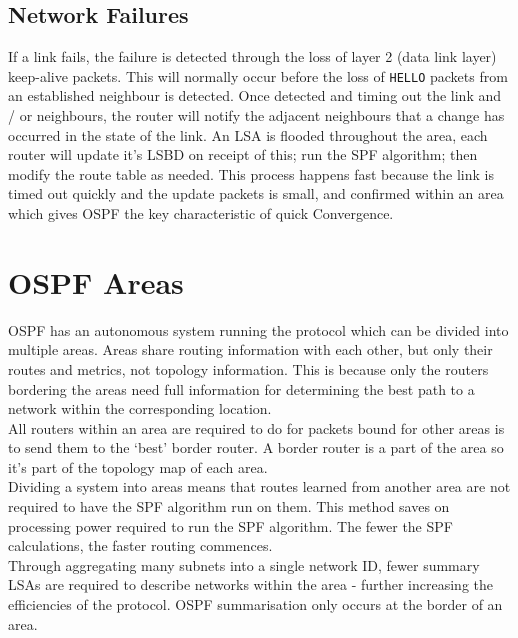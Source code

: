\subsection{Network Failures}
If a link fails, the failure is detected through the loss of layer 2 (data link layer) keep-alive packets. This will normally occur before the loss of \verb|HELLO| packets from an established neighbour is detected. Once detected and timing out the link and / or neighbours, the router will notify the adjacent neighbours that a change has occurred in the state of the link. An LSA is flooded throughout the area, each router will update it's LSBD on receipt of this; run the SPF algorithm; then modify the route table as needed. This process happens fast because the link is timed out quickly and the update packets is small, and confirmed within an area which gives OSPF the key characteristic of quick Convergence.

\section{OSPF Areas}
OSPF has an autonomous system running the protocol which can be divided into multiple areas. Areas share routing information with each other, but only their routes and metrics, not topology information. This is because only the routers bordering the areas need full information for determining the best path to a network within the corresponding location.\\

All routers within an area are required to do for packets bound for other areas is to send them to the `best' border router. A border router is a part of the area so it's part of the topology map of each area.\\

Dividing a system into areas means that routes learned from another area are not required to have the SPF algorithm run on them. This method saves on processing power required to run the SPF algorithm. The fewer the SPF calculations, the faster routing commences.\\

Through aggregating many subnets into a single network ID, fewer summary LSAs are required to describe networks within the area - further increasing the efficiencies of the protocol. OSPF summarisation only occurs at the border of an area.
